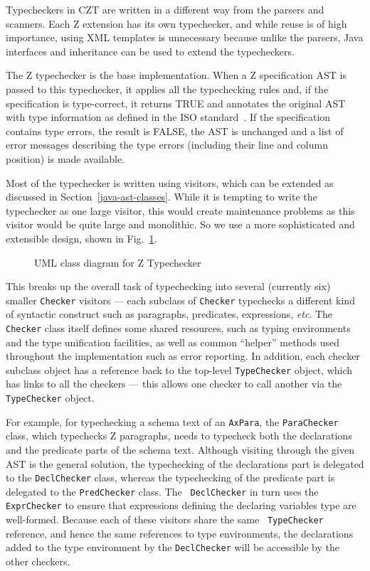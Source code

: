\documentclass{llncs}
\begin{document}
Typecheckers in CZT are written in a different way from the parsers
and scanners. Each Z extension has its own typechecker, and while reuse
is of high importance, using XML templates is unnecessary because
unlike the parsers, Java interfaces and inheritance can be used to
extend the typecheckers.

The Z typechecker is the base implementation.  When a Z specification
AST is passed to this typechecker, it applies all the typechecking
rules and, if the specification is type-correct, it returns TRUE and
annotates the original AST with type information as defined in the ISO
standard~\cite[Section~10]{isoz}.  If the specification contains type errors,
the result is FALSE, the AST is unchanged and a list of error messages
describing the type errors (including their line and column position)
is made available.

Most of the typechecker is written using visitors, which can be
extended as discussed in Section~\ref{java-ast-classes}.  While it is
tempting to write the typechecker as one large visitor, this would
create maintenance problems as this visitor would be quite large and
monolithic.  So we use a more sophisticated and extensible design,
shown in Fig.~\ref{fig:ztypechecker}.

\def\epsfsize#1#2{0.50#1}
\begin{figure}[t]
\begin{center}
\caption{UML class diagram for Z Typechecker}\label{fig:ztypechecker}
\end{center}
\end{figure}
\def\epsfsize#1#2{\epsfxsize}

This breaks up the overall task of typechecking into several
(currently six) smaller \texttt{Checker} visitors --- each subclass of
\texttt{Checker} typechecks a different kind of syntactic construct such
as paragraphs, predicates, expressions, \textit{etc}.  The \texttt{Checker}
class itself defines some shared resources, such as typing
environments and the type unification facilities, as well as common
``helper'' methods used throughout the implementation such as error
reporting.  In addition, each checker subclass object has a reference
back to the top-level \texttt{TypeChecker} object, which has links to
all the checkers --- this allows one checker to call another via the
\texttt{TypeChecker} object.

For example, for typechecking a schema text of an {\tt AxPara}, the
{\tt ParaChecker} class, which typechecks Z paragraphs, needs to
typecheck both the declarations and the predicate parts of the schema
text.  Although visiting through the given AST is the general
solution, the typechecking of the declarations part is delegated to
the {\tt DeclChecker} class, whereas the typechecking of the predicate
part is delegated to the {\tt PredChecker} class.  The {\tt
DeclChecker} in turn uses the {\tt ExprChecker} to ensure that
expressions defining the declaring variables type are
well-formed. Because each of these visitors share the same {\tt
TypeChecker} reference, and hence the same references to type
environments, the declarations added to the type environment by the
{\tt DeclChecker} will be accessible by the other checkers.
\end{document}
